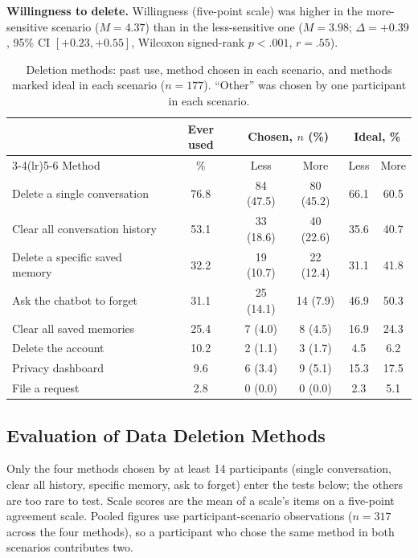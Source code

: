 \documentclass[conference,compsoc]{IEEEtran}
\begin{document}
\textbf{Willingness to delete.} Willingness (five-point scale) was higher in the more-sensitive scenario ($M=4.37$) than in the less-sensitive one ($M=3.98$; $\Delta=+0.39$, 95\% CI $[+0.23, +0.55]$, Wilcoxon signed-rank $p<.001$, $r=.55$).

\begin{table}[t]
\centering
\caption{Deletion methods: past use, method chosen in each scenario, and methods marked ideal in each scenario ($n=177$). ``Other'' was chosen by one participant in each scenario.}
\label{tab:method-usage}
\small
\begin{tabular}{lccccc}
\toprule
 & Ever used & \multicolumn{2}{c}{Chosen, $n$ (\%)} & \multicolumn{2}{c}{Ideal, \%} \\
\cmidrule(lr){3-4}\cmidrule(lr){5-6}
Method & \% & Less & More & Less & More \\
\midrule
Delete a single conversation & 76.8 & 84 (47.5) & 80 (45.2) & 66.1 & 60.5 \\
Clear all conversation history & 53.1 & 33 (18.6) & 40 (22.6) & 35.6 & 40.7 \\
Delete a specific saved memory & 32.2 & 19 (10.7) & 22 (12.4) & 31.1 & 41.8 \\
Ask the chatbot to forget & 31.1 & 25 (14.1) & 14 (7.9) & 46.9 & 50.3 \\
Clear all saved memories & 25.4 & 7 (4.0) & 8 (4.5) & 16.9 & 24.3 \\
Delete the account & 10.2 & 2 (1.1) & 3 (1.7) & 4.5 & 6.2 \\
Privacy dashboard & 9.6 & 6 (3.4) & 9 (5.1) & 15.3 & 17.5 \\
File a request & 2.8 & 0 (0.0) & 0 (0.0) & 2.3 & 5.1 \\
\bottomrule
\end{tabular}
\end{table}

\subsection{Evaluation of Data Deletion Methods}

Only the four methods chosen by at least 14 participants (single conversation, clear all history, specific memory, ask to forget) enter the tests below; the others are too rare to test. Scale scores are the mean of a scale's items on a five-point agreement scale. Pooled figures use participant-scenario observations ($n=317$ across the four methods), so a participant who chose the same method in both scenarios contributes two.
\end{document}
